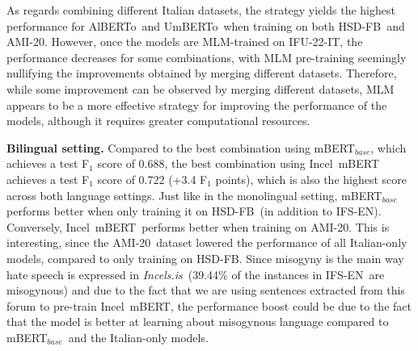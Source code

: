 \documentclass[11pt]{article}
\newcommand{\dsITcorpus}{IFU-22-IT}
\newcommand{\dsENclassification}{IFS-EN}
\newcommand{\mbert}{\mbox{mBERT$_{base}$}}
\newcommand{\imbert}{\mbox{Incel mBERT}}
\newcommand{\umbert}{\mbox{UmBERTo}}
\newcommand{\albert}{\mbox{AlBERTo}}
\newcommand{\iumbert}{\mbox{Incel UmBERTo}}
\newcommand{\ialbert}{\mbox{Incel AlBERTo}}
\newcommand{\hsdfb}{\mbox{HSD-FB}}
\newcommand{\hsdtw}{\mbox{HSD-TW}}
\newcommand{\ami}{\mbox{AMI-20}}
\newcommand{\enforum}{\textit{Incels.is}}
\begin{document}
As regards combining different Italian datasets, the strategy yields the highest performance for \albert\, and \umbert\, when training on both \hsdfb\, and \ami.
However, once the models are MLM-trained on \dsITcorpus, the performance decreases for some combinations, with MLM pre-training seemingly nullifying the improvements obtained by merging different datasets. Therefore, while some improvement can be observed by merging different datasets, MLM appears to be a more effective strategy for improving the performance of the models, although it requires greater computational resources.

\vspace*{1mm}
\noindent\textbf{Bilingual setting.}
Compared to the best combination using \mbert, which achieves a test F$_1$ score of 0.688, the best combination using \imbert\, achieves a test F$_1$ score of 0.722 (+3.4 F$_1$ points), which is also the highest score across both language settings. Just like in the monolingual setting, \mbert\, performs better when only training it on \hsdfb\, (in addition to \dsENclassification). Conversely, \imbert\, performs better when training on \ami. This is interesting, since the \ami\, dataset lowered the performance of all Italian-only models, compared to only training on \hsdfb. Since misogyny is the main way hate speech is expressed in \enforum\, (39.44\% of the instances in \dsENclassification\, are misogynous) and due to the fact that we are using sentences extracted from this forum to pre-train \imbert, the performance boost could be due to the fact that the model is better at learning about misogynous language compared to \mbert\, and the Italian-only models.
\end{document}

